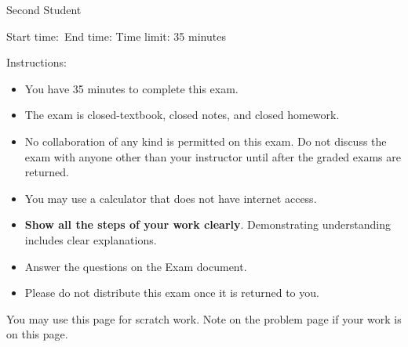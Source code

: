 \documentclass[main.tex,14pt]{subfiles}
\begin{document}
\setcounter{page}{0}
\thispagestyle{empty}

{\Large Second Student}%

{Start time:\hrulefill\ End time: \hrulefill}
Time limit: 35 minutes

\vspace{1cm}
{\Large Instructions:}
\begin{itemize}

 \item You have 35 minutes to complete this exam.

 \item The exam is closed-textbook, closed notes, and closed homework. 
 
 \item No collaboration of any kind is permitted on this exam. Do not discuss the exam with anyone other than your instructor until after the graded exams are returned.
 
 \item You may use a calculator that does not have internet access. 

 \item \textbf{Show all the steps of your work clearly}. Demonstrating understanding includes clear explanations.
 
\item Answer the questions on the Exam document. 


\item Please do not distribute this exam once it is returned to you.



 \end{itemize}


\afterpage{\blankpage}

\clearpage


 \begin{questions}


 \question 

 \question 

 \question 
 
 
\end{questions}

You may use this page for scratch work. Note on the problem page if your work is on this page.
\thispagestyle{empty}
\hbox{}


\checkoddpage{}
\end{document}
